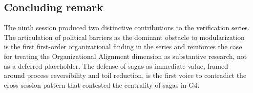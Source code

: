 \subsection*{Concluding remark}

The ninth session produced two distinctive contributions to the verification series. The articulation of political barriers as the dominant obstacle to modularization is the first first-order organizational finding in the series and reinforces the case for treating the Organizational Alignment dimension as substantive research, not as a deferred placeholder. The defense of sagas as immediate-value, framed around process reversibility and toil reduction, is the first voice to contradict the cross-session pattern that contested the centrality of sagas in G4.
